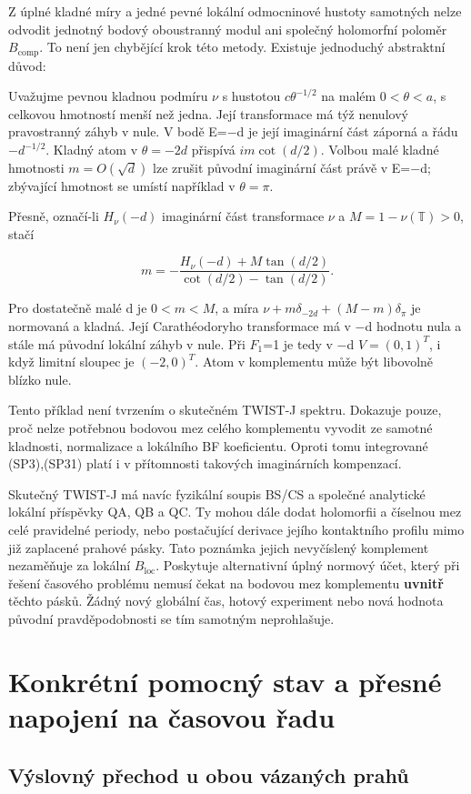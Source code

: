 \documentclass[11pt,a4paper]{article}
\theoremstyle{remark}\newtheorem{remark}[theorem]{Poznámka}
\numberwithin{equation}{section}
\begin{document}
Z úplné kladné míry a jedné pevné lokální odmocninové hustoty samotných
nelze odvodit jednotný bodový oboustranný modul ani společný holomorfní
poloměr \(B_{\mathrm{comp}}\). To není jen chybějící krok této metody.
Existuje jednoduchý abstraktní důvod:

Uvažujme pevnou kladnou podmíru \(\nu\) s hustotou \(c\theta^{-1/2}\) na
malém \(0<\theta<a\), s celkovou hmotností menší než jedna. Její
transformace má týž nenulový pravostranný záhyb v nule. V bodě E=−d je
její imaginární část záporná a řádu \(-d^{-1/2}\). Kladný atom v
\(\theta=-2d\) přispívá \(i m\cot(d/2)\). Volbou malé kladné hmotnosti
\(m=O(\sqrt d)\) lze zrušit původní imaginární část právě v E=−d;
zbývající hmotnost se umístí například v \(\theta=\pi\).

Přesně, označí-li \(H_\nu(-d)\) imaginární část transformace \(\nu\) a
\(M=1-\nu(\mathbb T)>0\), stačí

\[
m=-\frac{H_\nu(-d)+M\tan(d/2)}
{\cot(d/2)-\tan(d/2)}.
\]

Pro dostatečně malé d je \(0<m<M\), a míra
\(\nu+m\delta_{-2d}+(M-m)\delta_\pi\) je normovaná a kladná. Její
Carathéodoryho transformace má v −d hodnotu nula a stále má původní
lokální záhyb v nule. Při \(F_1\)=1 je tedy v −d \(V=(0,1)^T\), i když
limitní sloupec je \((-2,0)^T\). Atom v komplementu může být libovolně
blízko nule.

Tento příklad není tvrzením o skutečném TWIST-J spektru. Dokazuje pouze,
proč nelze potřebnou bodovou mez celého komplementu vyvodit ze samotné
kladnosti, normalizace a lokálního BF koeficientu. Oproti tomu
integrované (SP3),(SP31) platí i v přítomnosti takových imaginárních
kompenzací.

Skutečný TWIST-J má navíc fyzikální soupis BS/CS a společné analytické
lokální příspěvky QA, QB a QC. Ty mohou dále dodat holomorfii a číselnou
mez celé pravidelné periody, nebo postačující derivace jejího
kontaktního profilu mimo již zaplacené prahové pásky. Tato poznámka
jejich nevyčíslený komplement nezaměňuje za lokální
\(B_{\mathrm{loc}}\). Poskytuje alternativní úplný normový účet, který
při řešení časového problému nemusí čekat na bodovou mez komplementu
\textbf{uvnitř} těchto pásků. Žádný nový globální čas, hotový experiment
nebo nová hodnota původní pravděpodobnosti se tím samotným neprohlašuje.

\section{Konkrétní pomocný stav a přesné napojení na časovou řadu}
\hypertarget{vuxfdslovnuxfd-pux159echod-u-obou-vuxe1zanuxfdch-prahux16f}{%
\subsection{Výslovný přechod u obou vázaných
prahů}\label{vuxfdslovnuxfd-pux159echod-u-obou-vuxe1zanuxfdch-prahux16f}}
\end{document}
